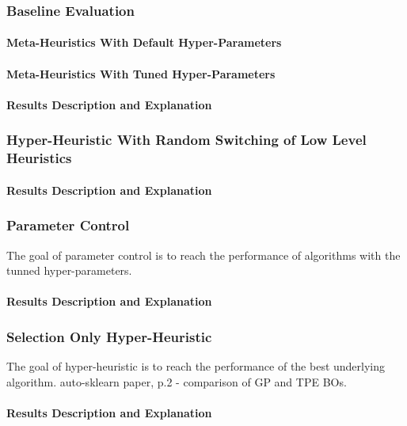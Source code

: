 \subsubsection{Baseline Evaluation}

\paragraph{Meta-Heuristics With Default Hyper-Parameters}

\paragraph{Meta-Heuristics With Tuned Hyper-Parameters}

\paragraph{Results Description and Explanation}


\subsubsection{Hyper-Heuristic With Random Switching of Low Level Heuristics}

\paragraph{Results Description and Explanation}


\subsubsection{Parameter Control}
The goal of parameter control is to reach the performance of algorithms with the tunned hyper-parameters.
\paragraph{Results Description and Explanation}


\subsubsection{Selection Only Hyper-Heuristic}
The goal of hyper-heuristic is to reach the performance of the best underlying algorithm.
auto-sklearn paper, p.2 - comparison of GP and TPE BOs.

\paragraph{Results Description and Explanation}


